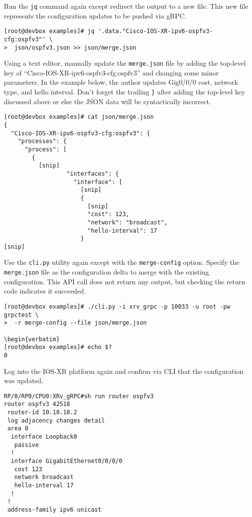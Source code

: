 Run the \verb|jq| command again except redirect the output to a new file. This new
file represents the configuration updates to be pushed via gRPC.

\begin{verbatim}
[root@devbox examples]# jq '.data."Cisco-IOS-XR-ipv6-ospfv3-cfg:ospfv3"' \
>  json/ospfv3.json >> json/merge.json
\end{verbatim}

Using a text editor, manually update the \verb|merge.json| file by adding the
top-level key of ``Cisco-IOS-XR-ipv6-ospfv3-cfg:ospfv3'' and changing some
minor parameters. In the example below, the author updates Gig0/0/0 cost,
network type, and hello interval. Don't forget the trailing \verb|}| after
adding the top-level key discussed above or else the JSON data will be
syntactically incorrect.

\begin{verbatim}
[root@devbox examples]# cat json/merge.json 
{
  "Cisco-IOS-XR-ipv6-ospfv3-cfg:ospfv3": {
    "processes": {
      "process": [
        {
          [snip]
                  "interfaces": {
                    "interface": [
                      [snip]
                      {
                        [snip]
                        "cost": 123,
                        "network": "broadcast",
                        "hello-interval": 17
                      }
[snip]
\end{verbatim}

Use the \verb|cli.py| utility again except with the \verb|merge-config|
option. Specify the \verb|merge.json| file as the configuration delta to merge
with the existing configuration. This API call does not return any output, but
checking the return code indicates it succeeded.

\begin{verbatim}
[root@devbox examples]# ./cli.py -i xrv_grpc -p 10033 -u root -pw grpctest \
>  -r merge-config --file json/merge.json

\begin{verbatim}
[root@devbox examples]# echo $?
0
\end{verbatim}

Log into the IOS-XR platform again and confirm via CLI that the configuration was updated.

\begin{verbatim}
RP/0/RP0/CPU0:XRv_gRPC#sh run router ospfv3
router ospfv3 42518
 router-id 10.10.10.2
 log adjacency changes detail
 area 0
  interface Loopback0
   passive
  !
  interface GigabitEthernet0/0/0/0
   cost 123
   network broadcast
   hello-interval 17
  !
 !
 address-family ipv6 unicast
\end{verbatim}

